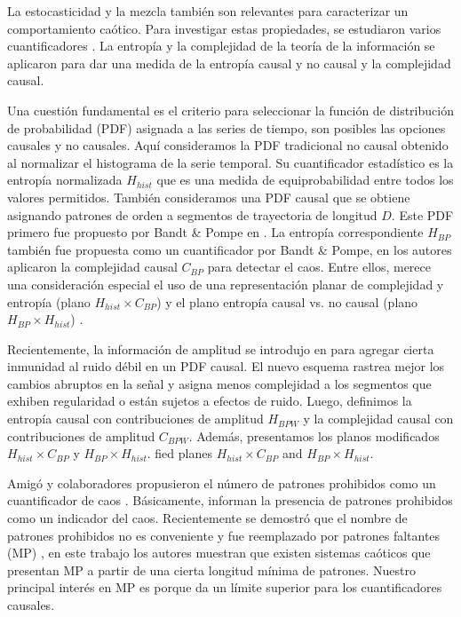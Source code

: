 La estocasticidad y la mezcla también son relevantes para caracterizar un comportamiento caótico.
Para investigar estas propiedades, se estudiaron varios cuantificadores \cite{DeMicco2009}.
La entropía y la complejidad de la teoría de la información se aplicaron para dar una medida de la entropía causal y no causal y la complejidad causal.

Una cuestión fundamental es el criterio para seleccionar la función de distribución de probabilidad (PDF) asignada a las series de tiempo, son posibles las opciones causales y no causales.
Aquí consideramos la PDF tradicional no causal obtenido al normalizar el histograma de la serie temporal.
Su cuantificador estadístico es la entropía normalizada $ H_ {hist} $ que es una medida de equiprobabilidad entre todos los valores permitidos.
También consideramos una PDF causal que se obtiene asignando patrones de orden a segmentos de trayectoria de longitud $D$.
Este PDF primero fue propuesto por Bandt \& Pompe en \cite{Bandt2002}.
La entropía correspondiente $H_{BP}$ también fue propuesta como un cuantificador por Bandt \& Pompe, en \cite{Rosso2007} los autores aplicaron la complejidad causal $C_{BP} $ para detectar el caos.
Entre ellos, merece una consideración especial el uso de una representación planar de complejidad y entropía (plano $H_{hist} \times C_{BP}$) y el plano entropía causal vs. no causal (plano $H_{BP} \times H_{hist}$) \cite{DeMicco2009, Rosso2007, Fouda2017, DeMicco2008, DeMicco2012, Rosso2010, Antonelli2017}.

Recientemente, la información de amplitud se introdujo en \cite{Fadlallah2013} para agregar cierta inmunidad al ruido débil en un PDF causal.
El nuevo esquema rastrea mejor los cambios abruptos en la señal y asigna menos complejidad a los segmentos que exhiben regularidad o están sujetos a efectos de ruido.
Luego, definimos la entropía causal con contribuciones de amplitud $H_{BPW}$ y la complejidad causal con contribuciones de amplitud $C_{BPW}$.
Además, presentamos los planos modificados $H_{hist} \times C_{BP} $ y $H_{BP} \times H_{hist}$.
fied planes $H_{hist} \times C_{BP}$ and $H_{BP} \times H_{hist}$.

Amigó y colaboradores propusieron el número de patrones prohibidos como un cuantificador de caos \cite{Amigo2007a}.
Básicamente, informan la presencia de patrones prohibidos como un indicador del caos.
Recientemente se demostró que el nombre de patrones prohibidos no es conveniente y fue reemplazado por patrones faltantes (MP) \cite{Rosso2012}, en este trabajo los autores muestran que existen sistemas caóticos que presentan MP a partir de una cierta longitud mínima de patrones.
Nuestro principal interés en MP es porque da un límite superior para los cuantificadores causales.

